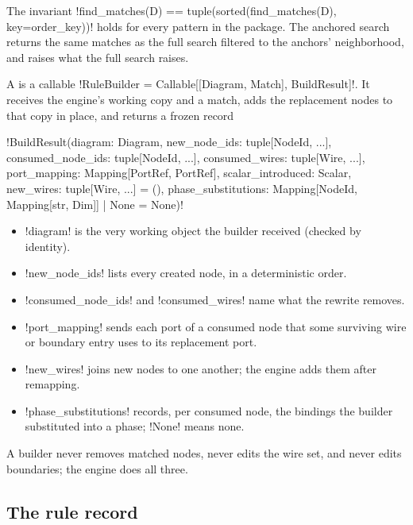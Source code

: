 The invariant \py!find_matches(D) == tuple(sorted(find_matches(D), key=order_key))! holds for
every pattern in the package. The anchored search returns the same matches as the full search
filtered to the anchors' neighborhood, and raises what the full search raises.

\begin{definition}\label{def:rewriting-buildresult}
A  is a callable \py!RuleBuilder = Callable[[Diagram, Match], BuildResult]!. It
receives the engine's working copy and a match, adds the replacement nodes to that copy in place,
and returns a frozen record
\begin{signature}
\py!BuildResult(diagram: Diagram, new_node_ids: tuple[NodeId, ...], consumed_node_ids: tuple[NodeId, ...], consumed_wires: tuple[Wire, ...], port_mapping: Mapping[PortRef, PortRef], scalar_introduced: Scalar, new_wires: tuple[Wire, ...] = (), phase_substitutions: Mapping[NodeId, Mapping[str, Dim]] | None = None)!
\end{signature}
\begin{itemize}
\item \py!diagram! is the very working object the builder received (checked by identity).
\item \py!new_node_ids! lists every created node, in a deterministic order.
\item \py!consumed_node_ids! and \py!consumed_wires! name what the rewrite removes.
\item \py!port_mapping! sends each port of a consumed node that some surviving wire or boundary
  entry uses to its replacement port.
\item \py!new_wires! joins new nodes to one another; the engine adds them after remapping.
\item \py!phase_substitutions! records, per consumed node, the bindings the builder substituted
  into a phase; \py!None! means none.
\end{itemize}
A builder never removes matched nodes, never edits the wire set, and never edits boundaries; the
engine does all three.
\end{definition}

\subsection{The rule record}

